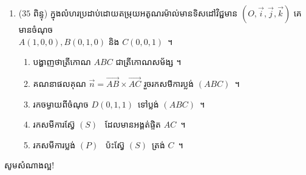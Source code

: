 \documentclass[a4paper, 12pt]{exam}
\def\hhard{\leavevmode\makebox[0pt][r]{\large\ensuremath{\star\star}\hspace{2em}}}
\begin{document}
\begin{enumerate}[I]
	\item\hhard ($ 35 $ ពិន្ទុ) ក្នុងលំហរប្រដាប់ដោយតម្រុយអតូណរម៉ាល់មានទិសដៅវិជ្ជមាន $ (O,\vec{i},\vec{j},\vec{k}) $ គេមានចំណុច​\\
	$ A(1,0,0),B(0,1,0) $ និង $ C(0,0,1) $~។
	\begin{enumerate}[a]
		\item បង្ហាញថាត្រីកោណ $ABC$ ជាត្រីកោណសម័ង្ស ។
		
		\item គណនាផលគុណ $ \overrightarrow{n}= \overrightarrow{AB}\times\overrightarrow{AC}$ រួចរកសមីការប្លង់ $(ABC)$~។
		\item រកចម្ងាយពីចំណុច $D(0, 1, 1)$~ទៅប្លង់ $(ABC)$~។
		\item រកសមីការស្វ៊ែ $(S)$~ ដែលមានអង្គត់ផ្ចិត $AC$~។
		\item រកសមីការប្លង់ $(P)$~ ប៉ះស្វ៊ែ $(S)$~ត្រង់ $C$~។ 
	\end{enumerate}
\end{enumerate}
\begin{center}
	\sffamily\color{black}
	សូមសំណាងល្អ!
\end{center}\newpage
\end{document}
